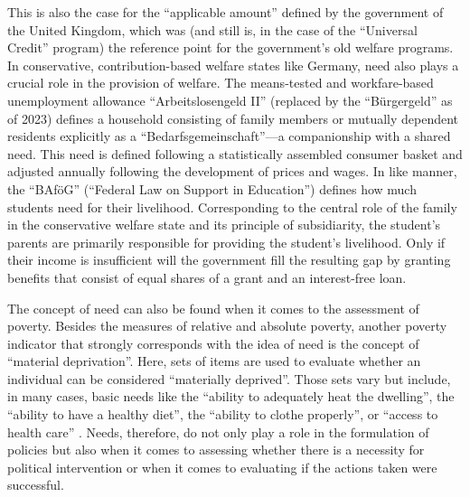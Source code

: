 \documentclass[12pt]{scrartcl}
\begin{document}
This is also the case for the ``applicable amount'' defined by the government of the United Kingdom, which was (and still is, in the case of the ``Universal Credit'' program) the reference point for the government's old welfare programs.
In conservative, contribution-based welfare states like Germany, need also plays a crucial role in the provision of welfare.
The means-tested and workfare-based unemployment allowance ``Arbeitslosengeld II'' (replaced by the ``B{\"u}rgergeld'' as of 2023) defines a household consisting of family members or mutually dependent residents explicitly as a ``Bedarfs\-gemeinschaft''---a companionship with a shared need.
This need is defined following a statistically assembled consumer basket and adjusted annually following the development of prices and wages.
In like manner, the ``BAf{\"o}G'' (``Federal Law on Support in Education'') defines how much students need for their livelihood.
Corresponding to the central role of the family in the conservative welfare state and its principle of subsidiarity, the student's parents are primarily responsible for providing the student's livelihood.
Only if their income is insufficient will the government fill the resulting gap by granting benefits that consist of equal shares of a grant and an interest-free loan.

The concept of need can also be found when it comes to the assessment of poverty.
Besides the measures of relative and absolute poverty, another poverty indicator that strongly corresponds with the idea of need is the concept of ``material deprivation''.
Here, sets of items are used to evaluate whether an individual can be considered ``materially deprived''.
Those sets vary but include, in many cases, basic needs like the ``ability to adequately heat the dwelling'', the ``ability to have a healthy diet'', the ``ability to clothe properly'', or ``access to health care'' \citep[p.~37]{boarini_measures_2006}.
Needs, therefore, do not only play a role in the formulation of policies but also when it comes to assessing whether there is a necessity for political intervention or when it comes to evaluating if the actions taken were successful.
\end{document}
